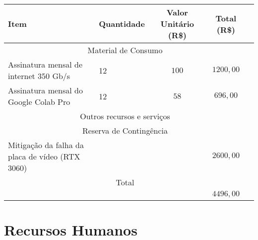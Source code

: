 \noindent \begin{tabular} {|X p{4cm}|c|c|c|}
	\hline
	{\cellcolor{shadecolor}} Item                   & {\cellcolor{shadecolor}} Quantidade & {\cellcolor{shadecolor}} Valor Unitário (R\$) & {\cellcolor{shadecolor}} Total (R\$) \\ \hline
	\hline
	\multicolumn{4}{|c|}{Material de Consumo}                                                                                                                                    \\ \hline
	Assinatura mensal de internet 350 Gb/s          & 12                                  & $100$                                         & $1200,00$                            \\ \hline
	Assinatura mensal do Google Colab Pro           & 12                                  & $58$                                          & $696,00$                             \\ \hline
	\hline
	\multicolumn{4}{|c|}{Outros recursos e serviços}                                                                                                                             \\ \hline
	\multicolumn{4}{|c|}{Reserva de Contingência}                                                                                                                                \\ \hline
	Mitigação da falha da placa de vídeo (RTX 3060) &                                     &                                               & $2600,00$                            \\ \hline
	\hline
	\multicolumn{4}{|c|}{Total}                                                                                                                                                  \\ \hline
	                                                &                                     &                                               & $4496,00$                            \\ \hline
\end{tabular}

\section{Recursos Humanos}

